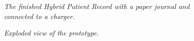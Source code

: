 
\begin{figure}[h]
  \caption{\small {\it {The finished Hybrid Patient Record with a paper journal and connected to a charger.}}} 
  \label{fig:journal-1}
\end{figure}

\begin{figure}[h]
  \caption{\small {\it {Exploded view of the prototype.}}} 
  \label{fig:explode}
\end{figure}

